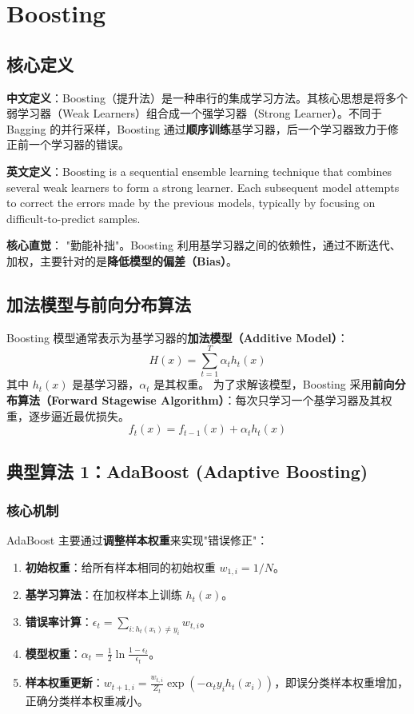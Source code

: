 \documentclass[12pt, a4paper]{book}
\begin{document}
\chapter{Boosting}


\section{核心定义}
\textbf{中文定义}：Boosting（提升法）是一种串行的集成学习方法。其核心思想是将多个弱学习器（Weak Learners）组合成一个强学习器（Strong Learner）。不同于 Bagging 的并行采样，Boosting 通过\textbf{顺序训练}基学习器，后一个学习器致力于修正前一个学习器的错误。

\textbf{英文定义}：Boosting is a sequential ensemble learning technique that combines several weak learners to form a strong learner. Each subsequent model attempts to correct the errors made by the previous models, typically by focusing on difficult-to-predict samples.

\textbf{核心直觉}：
"勤能补拙"。Boosting 利用基学习器之间的依赖性，通过不断迭代、加权，主要针对的是\textbf{降低模型的偏差（Bias）}。

\section{加法模型与前向分布算法}
Boosting 模型通常表示为基学习器的\textbf{加法模型（Additive Model）}：
$$ H(x) = \sum_{t=1}^T \alpha_t h_t(x) $$
其中 $h_{t}(x)$ 是基学习器，$\alpha_t$ 是其权重。
为了求解该模型，Boosting 采用\textbf{前向分布算法（Forward Stagewise Algorithm）}：每次只学习一个基学习器及其权重，逐步逼近最优损失。
$$ f_t(x) = f_{t-1}(x) + \alpha_t h_t(x) $$

\section{典型算法 1：AdaBoost (Adaptive Boosting)}

\subsection{核心机制}
AdaBoost 主要通过\textbf{调整样本权重}来实现"错误修正"：
\begin{enumerate}
    \item \textbf{初始权重}：给所有样本相同的初始权重 $w_{1,i} = 1/N$。
    \item \textbf{基学习算法}：在加权样本上训练 $h_t(x)$。
    \item \textbf{错误率计算}：$\epsilon_t = \sum_{i: h_t(x_i) \neq y_i} w_{t,i}$。
    \item \textbf{模型权重}：$\alpha_t = \frac{1}{2} \ln \frac{1-\epsilon_t}{\epsilon_t}$。
    \item \textbf{样本权重更新}：$w_{t+1, i} = \frac{w_{t,i}}{Z_t} \exp(-\alpha_t y_i h_t(x_i))$，即误分类样本权重增加，正确分类样本权重减小。
\end{enumerate}
\end{document}
